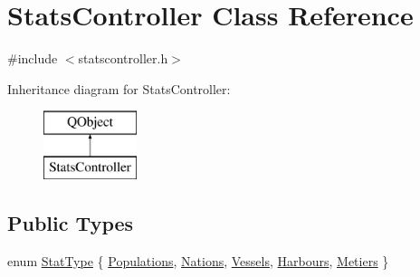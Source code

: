\hypertarget{class_stats_controller}{}\section{Stats\+Controller Class Reference}
\label{class_stats_controller}


{\ttfamily \#include $<$statscontroller.\+h$>$}

Inheritance diagram for Stats\+Controller\+:\begin{figure}[H]
\begin{center}
\leavevmode
\includegraphics[height=2.000000cm]{d4/d76/class_stats_controller}
\end{center}
\end{figure}
\subsection*{Public Types}
\begin{DoxyCompactItemize}
\item 
enum \mbox{\hyperlink{class_stats_controller_a57467d760850639d3b0c55277b7e7ee9}{Stat\+Type}} \{ \newline
\mbox{\hyperlink{class_stats_controller_a57467d760850639d3b0c55277b7e7ee9a301c79b6b2141d05530e37e930b8b672}{Populations}}, 
\mbox{\hyperlink{class_stats_controller_a57467d760850639d3b0c55277b7e7ee9a14cbf1774e4f748cbb88d616afd14ef1}{Nations}}, 
\mbox{\hyperlink{class_stats_controller_a57467d760850639d3b0c55277b7e7ee9a4d2f5976d5452f9dd8d5d268bf6cea41}{Vessels}}, 
\mbox{\hyperlink{class_stats_controller_a57467d760850639d3b0c55277b7e7ee9a93c565867529ce8d3f99932dd9541656}{Harbours}}, 
\newline
\mbox{\hyperlink{class_stats_controller_a57467d760850639d3b0c55277b7e7ee9a574b6c70d1fc69067d2de9de7030e40d}{Metiers}}
 \}
\end{DoxyCompactItemize}
